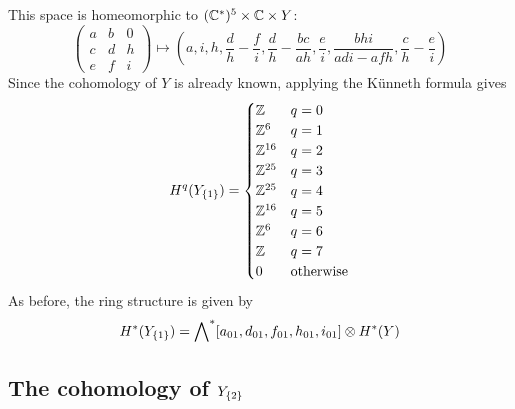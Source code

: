 This space is homeomorphic to $(\mathbb{C}^*)^5 \times \mathbb{C}\times Y$:
\[ \begin{pmatrix}
  a & b & 0 \\
  c & d & h \\
  e & f & i
\end{pmatrix} \mapsto \left(
a, i, h, \frac{d}{h}-\frac{f}{i}, \frac{d}{h}-\frac{bc}{ah},
\frac{e}{i}, \frac{bhi}{adi-afh},\frac{c}{h}-\frac{e}{i}
\right) \] 
Since the cohomology of $Y$ is already known, applying the K\"unneth
formula gives
\[ H^q(Y_{\left\{ 1 \right\}}) =
\begin{cases}
  \mathbb{Z} & q = 0 \\
  \mathbb{Z}^6 & q = 1 \\
  \mathbb{Z}^{16} & q = 2 \\
  \mathbb{Z}^{25} & q = 3 \\
  \mathbb{Z}^{25} & q = 4 \\
  \mathbb{Z}^{16} & q = 5 \\
  \mathbb{Z}^6 & q = 6 \\
  \mathbb{Z} & q = 7 \\
  0 & \text{otherwise}
\end{cases} \] 
As before, the ring structure is given by
\[ H^*(Y_{\left\{ 1 \right\}}) =
\bigwedge\nolimits^*[a_{01},d_{01},f_{01},h_{01},i_{01}] \otimes H^*(Y)\]

\subsection{The cohomology of $Y_{\left\{ 2 \right\}}$}

